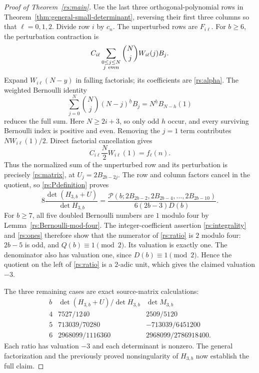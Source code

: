 \documentclass[11pt,a4paper]{article}
\numberwithin{equation}{section}
\theoremstyle{plain}
\theoremstyle{definition}
\theoremstyle{remark}
\begin{document}
\begin{proof}[Proof of Theorem~\ref{rs:main}]
Use the last three orthogonal-polynomial rows in
Theorem~\ref{thm:general-small-determinant}, reversing their first
three columns so that $\ell=0,1,2$. Divide row $i$ by $c_n$.
The unperturbed rows are $F_{i\ell}$.
For $b\ge6$, the perturbation contraction is
\[
 C_{i\ell}\sum_{\substack{0\le j\le N\\j\ {\rm even}}}
          \binom Nj W_{i\ell}(j)B_j.
\]
Expand $W_{i\ell}(N-y)$ in falling factorials; its coefficients
are \eqref{rs:alpha}. The weighted Bernoulli identity
\[
 \sum_{j=0}^N\binom Nj (N-j)^{\underline h}B_j
       =N^{\underline h}B_{N-h}(1)
\]
reduces the full sum. Here $N\ge2i+3$, so only odd $h$ occur,
and every surviving Bernoulli index is positive and even.
Removing the $j=1$ term contributes $NW_{i\ell}(1)/2$.
Direct factorial cancellation gives
\[
 C_{i\ell}\frac N2W_{i\ell}(1)=f_\ell(n).
\]
Thus the normalized sum of the unperturbed row and its perturbation
is precisely \eqref{rs:matrix}, at
$U_j=2B_{2b-2j}$. The row and column factors cancel in the quotient,
so \eqref{rs:Pdefinition} proves
\begin{equation}\label{rs:ratio}
 8\frac{\det(H_{3,b}+U)}{\det H_{3,b}}
 =\frac{\mathscr P(b;2B_{2b-2},2B_{2b-4},\ldots,2B_{2b-10})}
             {6(2b-3)D(b)}.
\end{equation}
For $b\ge7$, all five doubled Bernoulli numbers are $1$ modulo
four by Lemma~\ref{rs:Bernoulli-mod-four}.
The integer-coefficient assertion \eqref{rs:integrality} and
\eqref{rs:ones} therefore show that the numerator of
\eqref{rs:ratio} is $2$ modulo four: $2b-5$ is odd, and
$Q(b)\equiv1\pmod2$. Its valuation is exactly one.
The denominator also has valuation one, since
$D(b)\equiv1\pmod2$. Hence the quotient on the left of
\eqref{rs:ratio} is a $2$-adic unit, which gives the claimed
valuation $-3$.

The three remaining cases are exact source-matrix calculations:
\[
\begin{array}{c|c|c}
 b&\det(H_{3,b}+U)/\det H_{3,b}&\det M_{3,b}\\\hline
 4&7527/1240&2509/5120\\
 5&713039/70280&-713039/6451200\\
 6&2968099/1116360&2968099/2786918400.
\end{array}
\]
Each ratio has valuation $-3$ and each determinant is nonzero.
The general factorization and the previously proved nonsingularity
of $H_{3,b}$ now establish the full claim.
\end{proof}
\end{document}
